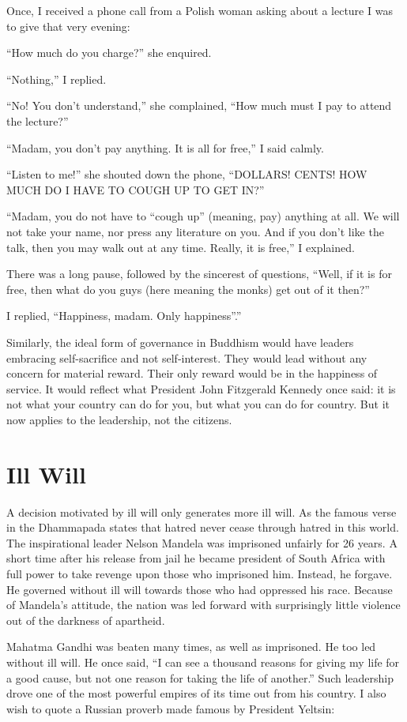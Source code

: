 \documentclass[11pt, openany]{book}
\begin{document}
Once, I received a phone call from a Polish woman asking about a lecture I was to give that very evening:

“How much do you charge?” she enquired.

“Nothing,” I replied.

“No! You don’t understand,” she complained, “How much must I pay to attend the lecture?”

“Madam, you don’t pay anything. It is all for free,” I said calmly.

“Listen to me!” she shouted down the phone, “DOLLARS! CENTS! HOW MUCH DO I HAVE TO COUGH UP TO GET IN?”

“Madam, you do not have to “cough up” (meaning, pay) anything at all. We will not take your name, nor press any literature on you. And if you don’t like the talk, then you may walk out at any time. Really, it is free,” I explained.

There was a long pause, followed by the sincerest of questions, “Well, if it is for free, then what do you guys (here meaning the monks) get out of it then?”

I replied, “Happiness, madam. Only happiness”.”

Similarly, the ideal form of governance in Buddhism would have leaders embracing self-sacrifice and not self-interest. They would lead without any concern for material reward. Their only reward would be in the happiness of service. It would reflect what President John Fitzgerald Kennedy once said: it is not what your country can do for you, but what you can do for country. But it now applies to the leadership, not the citizens.

\section{Ill Will}

A decision motivated by ill will only generates more ill will. As the famous verse in the Dhammapada states that hatred never cease through hatred in this world. The inspirational leader Nelson Mandela was imprisoned unfairly for 26 years. A short time after his release from jail he became president of South Africa with full power to take revenge upon those who imprisoned him. Instead, he forgave. He governed without ill will towards those who had oppressed his race. Because of Mandela’s attitude, the nation was led forward with surprisingly little violence out of the darkness of apartheid.

Mahatma Gandhi was beaten many times, as well as imprisoned. He too led without ill will. He once said, “I can see a thousand reasons for giving my life for a good cause, but not one reason for taking the life of another.” Such leadership drove one of the most powerful empires of its time out from his country. I also wish to quote a Russian proverb made famous by President Yeltsin:
\end{document}
